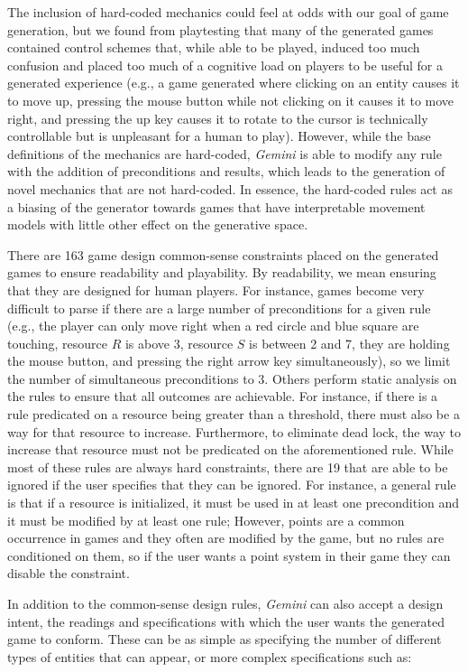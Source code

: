 \documentclass[12pt]{report}
\begin{document}
The inclusion of hard-coded mechanics could feel at odds with our goal of game generation, but we found from playtesting that many of the generated games contained control schemes that, while able to be played, induced too much confusion and placed too much of a cognitive load on players to be useful for a generated experience (e.g., a game generated where clicking on an entity causes it to move up, pressing the mouse button while not clicking on it causes it to move right, and pressing the up key causes it to rotate to the cursor is technically controllable but is unpleasant for a human to play).  However, while the base definitions of the mechanics are hard-coded, \textit{Gemini} is able to modify any rule with the addition of preconditions and results, which leads to the generation of novel mechanics that are not hard-coded.  In essence, the hard-coded rules act as a biasing of the generator towards games that have interpretable movement models with little other effect on the generative space. 

There are 163 game design common-sense constraints placed on the generated games to ensure readability and playability. By readability, we mean ensuring that they are designed for human players.  For instance, games become very difficult to parse if there are a large number of preconditions for a given rule (e.g., the player can only move right when a red circle and blue square are touching, resource $R$ is above 3, resource $S$ is between 2 and 7, they are holding the mouse button, and pressing the right arrow key simultaneously), so we limit the number of simultaneous preconditions to 3.  Others perform static analysis on the rules to ensure that all outcomes are achievable.  For instance, if there is a rule predicated on a resource being greater than a threshold, there must also be a way for that resource to increase.  Furthermore, to eliminate dead lock, the way to increase that resource must not be predicated on the aforementioned rule.  While most of these rules are always hard constraints, there are 19 that are able to be ignored if the user specifies that they can be ignored.  For instance, a general rule is that if a resource is initialized, it must be used in at least one precondition and it must be modified by at least one rule; However, points are a common occurrence in games and they often are modified by the game, but no rules are conditioned on them, so if the user wants a point system in their game they can disable the constraint.

In addition to the common-sense design rules, \textit{Gemini} can also accept a design intent, the readings and specifications with which the user wants the generated game to conform.  These can be as simple as specifying the number of different types of entities that can appear, or more complex specifications such as:
\end{document}
